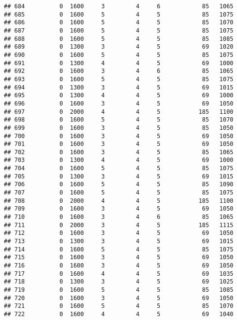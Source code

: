 \documentclass[]{article}
\begin{document}
\begin{verbatim}
## 684          0  1600     3         4     6            85   1065
## 685          0  1600     5         4     5            85   1075
## 686          0  1600     5         4     5            85   1070
## 687          0  1600     5         4     5            85   1075
## 688          0  1600     5         4     5            85   1085
## 689          0  1300     3         4     5            69   1020
## 690          0  1600     5         4     5            85   1075
## 691          0  1300     4         4     5            69   1000
## 692          0  1600     3         4     6            85   1065
## 693          0  1600     5         4     5            85   1075
## 694          0  1300     3         4     5            69   1015
## 695          0  1300     4         4     5            69   1000
## 696          0  1600     3         4     5            69   1050
## 697          0  2000     4         4     5           185   1100
## 698          0  1600     5         4     5            85   1070
## 699          0  1600     3         4     5            85   1050
## 700          0  1600     3         4     5            69   1050
## 701          0  1600     3         4     5            69   1050
## 702          0  1600     3         4     5            85   1065
## 703          0  1300     4         4     5            69   1000
## 704          0  1600     5         4     5            85   1075
## 705          0  1300     3         4     5            69   1015
## 706          0  1600     5         4     5            85   1090
## 707          0  1600     5         4     5            85   1075
## 708          0  2000     4         4     5           185   1100
## 709          0  1600     3         4     5            69   1050
## 710          0  1600     3         4     6            85   1065
## 711          0  2000     3         4     5           185   1115
## 712          0  1600     3         4     5            69   1050
## 713          0  1300     3         4     5            69   1015
## 714          0  1600     5         4     5            85   1075
## 715          0  1600     3         4     5            69   1050
## 716          0  1600     3         4     5            69   1050
## 717          0  1600     4         4     5            69   1035
## 718          0  1300     3         4     5            69   1025
## 719          0  1600     5         4     5            85   1085
## 720          0  1600     3         4     5            69   1050
## 721          0  1600     5         4     5            85   1070
## 722          0  1600     4         4     5            69   1040

\end{verbatim}
\end{document}

